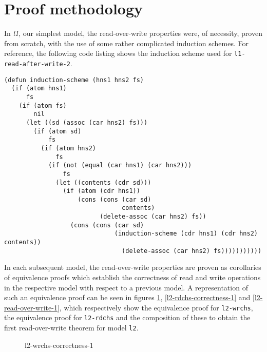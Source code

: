 \documentclass[runningheads,a4paper]{llncs}
\begin{document}
\section{Proof methodology}

In \textit{l1}, our simplest model, the read-over-write properties
were, of necessity, proven from scratch, with the use of some rather
complicated induction schemes. For reference, the following code listing shows
the induction scheme used for \texttt{l1-read-after-write-2}.

\medskip

\noindent
\begin{verbatim}
(defun induction-scheme (hns1 hns2 fs)
  (if (atom hns1)
      fs
    (if (atom fs)
        nil
      (let ((sd (assoc (car hns2) fs)))
        (if (atom sd)
            fs
          (if (atom hns2)
              fs
            (if (not (equal (car hns1) (car hns2)))
                fs
              (let ((contents (cdr sd)))
                (if (atom (cdr hns1))
                    (cons (cons (car sd)
                                contents)
                          (delete-assoc (car hns2) fs))
                  (cons (cons (car sd)
                              (induction-scheme (cdr hns1) (cdr hns2) contents))
                                (delete-assoc (car hns2) fs)))))))))))
\end{verbatim}

In each subsequent model, the read-over-write properties are proven as
corollaries of equivalence proofs which establish the correctness of
read and write operations in the respective model with respect to a
previous model. A representation of such an equivalence proof can be
seen in figures \ref{l2-wrchs-correctness-1},
\ref{l2-rdchs-correctness-1} and \ref{l2-read-over-write-1}, which
respectively show the equivalence proof for \texttt{l2-wrchs}, the
equivalence proof for \texttt{l2-rdchs} and the composition of these
to obtain the first read-over-write theorem for model \texttt{l2}.


\begin{figure}
  \centering
  \caption{l2-wrchs-correctness-1}
  \label{l2-wrchs-correctness-1}
\end{figure}
\end{document}

